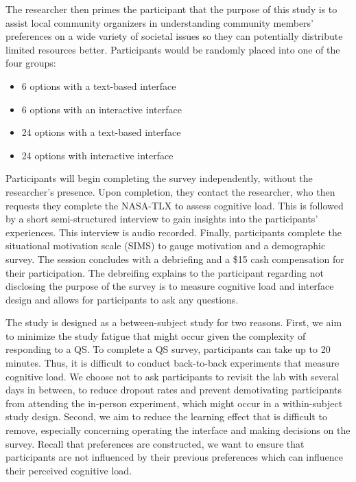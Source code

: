 The researcher then primes the participant that the purpose of this study is to assist local community organizers in understanding community members' preferences on a wide variety of societal issues so they can potentially distribute limited resources better. Participants would be randomly placed into one of the four groups:

\begin{itemize}
    \item 6 options with a text-based interface
    \item 6 options with an interactive interface
    \item 24 options with a text-based interface
    \item 24 options with interactive interface
\end{itemize}

Participants will begin completing the survey independently, without the researcher's presence. Upon completion, they contact the researcher, who then requests they complete the NASA-TLX to assess cognitive load. This is followed by a short semi-structured interview to gain insights into the participants' experiences. This interview is audio recorded. Finally, participants complete the situational motivation scale (SIMS) to gauge motivation and a demographic survey. The session concludes with a debriefing and a \$15 cash compensation for their participation. The debreifing explains to the participant regarding not disclosing the purpose of the survey is to measure cognitive load and interface design and allows for participants to ask any questions.

The study is designed as a between-subject study for two reasons. First, we aim to minimize the study fatigue that might occur given the complexity of responding to a QS. To complete a QS survey, participants can take up to 20 minutes. Thus, it is difficult to conduct back-to-back experiments that measure cognitive load. We choose not to ask participants to revisit the lab with several days in between, to reduce dropout rates and prevent demotivating participants from attending the in-person experiment, which might occur in a within-subject study design. Second, we aim to reduce the learning effect that is difficult to remove, especially concerning operating the interface and making decisions on the survey. Recall that preferences are constructed, we want to ensure that participants are not influenced by their previous preferences which can influence their perceived cognitive load.

